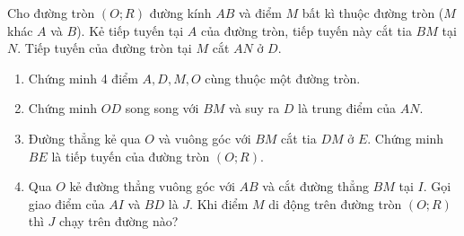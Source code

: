 \begin{ex}%
	Cho đường tròn $(O;R)$ đường kính $AB$ và điểm $M$ bất kì thuộc đường tròn ($M$ khác $A$ và $B$). Kẻ tiếp tuyến tại $A$ của đường tròn, tiếp tuyến này cắt tia $BM$ tại $N$. Tiếp tuyến của đường tròn tại $M$ cắt $AN$ ở $D$.
	\begin{enumerate}
		\item Chứng minh 4 điểm $A, D, M, O$ cùng thuộc một đường tròn.
		\item Chứng minh $OD$ song song với $BM$ và suy ra $D$ là trung điểm của $AN$.
		\item Đường thẳng kẻ qua $O$ và vuông góc với $BM$ cắt tia $DM$ ở $E$. Chứng minh $BE$ là tiếp tuyến của đường tròn $(O;R)$.
		\item Qua $O$ kẻ đường thẳng vuông góc với $AB$ và cắt đường thẳng $BM$ tại $I$. Gọi giao điểm của $AI$ và $BD$ là $J$. Khi điểm $M$ di động trên đường tròn $(O;R)$ thì $J$ chạy trên đường nào?
	\end{enumerate}
\end{ex}
